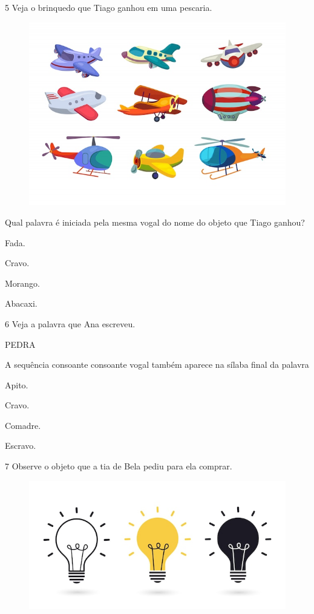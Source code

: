 \num{5} Veja o brinquedo que Tiago ganhou em uma pescaria.

\begin{figure}[htpb!]
\centering
\includegraphics[width=.5\textwidth]{media/image177.jpeg}
\end{figure}


Qual palavra é iniciada pela mesma vogal do nome do objeto que Tiago ganhou?

\begin{escolha}
\item Fada.

\item Cravo.

\item Morango.

\item Abacaxi.
\end{escolha}

\num{6} Veja a palavra que Ana escreveu.

\begin{myquote}
PEDRA
\end{myquote}

A sequência consoante consoante vogal também aparece na sílaba final da palavra

\begin{escolha}
\item Apito.

\item Cravo.

\item Comadre.

\item Escravo.
\end{escolha}

\num{7} Observe o objeto que a tia de Bela pediu para ela comprar.

\begin{figure}[htpb!]
\centering
\includegraphics[width=.5\textwidth]{media/image178.jpeg}
\end{figure}

